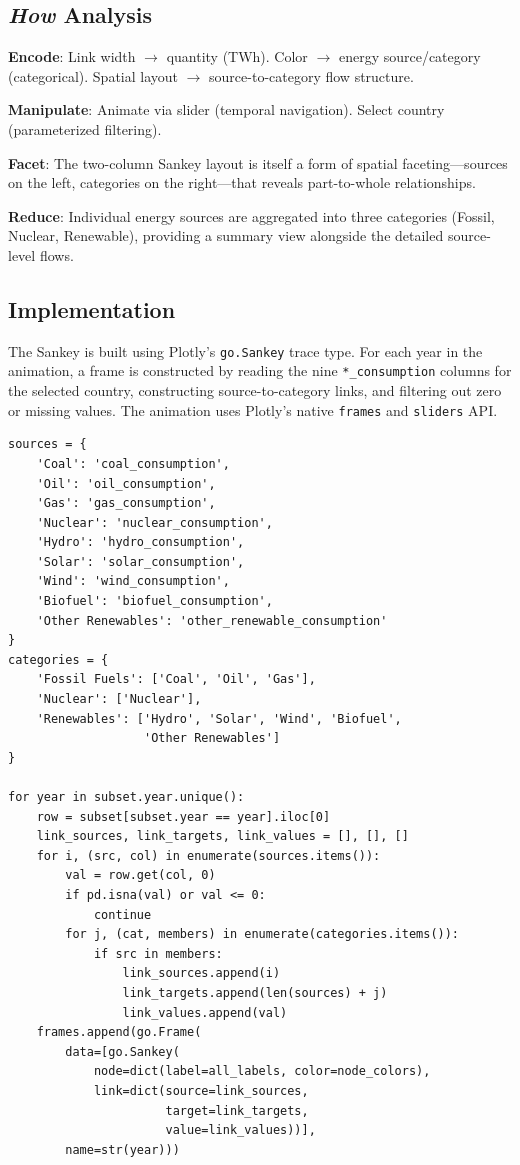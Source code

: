 \documentclass[10pt]{article}
\begin{document}
\subsection{\emph{How} Analysis}

\textbf{Encode}: Link width $\rightarrow$ quantity (TWh). Color $\rightarrow$ energy source/category (categorical). Spatial layout $\rightarrow$ source-to-category flow structure.

\textbf{Manipulate}: Animate via slider (temporal navigation). Select country (parameterized filtering).

\textbf{Facet}: The two-column Sankey layout is itself a form of spatial faceting---sources on the left, categories on the right---that reveals part-to-whole relationships.

\textbf{Reduce}: Individual energy sources are aggregated into three categories (Fossil, Nuclear, Renewable), providing a summary view alongside the detailed source-level flows.

\subsection{Implementation}

The Sankey is built using Plotly's \texttt{go.Sankey} trace type. For each year in the animation, a frame is constructed by reading the nine \texttt{*\_consumption} columns for the selected country, constructing source-to-category links, and filtering out zero or missing values. The animation uses Plotly's native \texttt{frames} and \texttt{sliders} API.

\begin{lstlisting}[caption={Core Sankey frame construction (simplified)},label=lst:sankey]
sources = {
    'Coal': 'coal_consumption',
    'Oil': 'oil_consumption',
    'Gas': 'gas_consumption',
    'Nuclear': 'nuclear_consumption',
    'Hydro': 'hydro_consumption',
    'Solar': 'solar_consumption',
    'Wind': 'wind_consumption',
    'Biofuel': 'biofuel_consumption',
    'Other Renewables': 'other_renewable_consumption'
}
categories = {
    'Fossil Fuels': ['Coal', 'Oil', 'Gas'],
    'Nuclear': ['Nuclear'],
    'Renewables': ['Hydro', 'Solar', 'Wind', 'Biofuel',
                   'Other Renewables']
}

for year in subset.year.unique():
    row = subset[subset.year == year].iloc[0]
    link_sources, link_targets, link_values = [], [], []
    for i, (src, col) in enumerate(sources.items()):
        val = row.get(col, 0)
        if pd.isna(val) or val <= 0:
            continue
        for j, (cat, members) in enumerate(categories.items()):
            if src in members:
                link_sources.append(i)
                link_targets.append(len(sources) + j)
                link_values.append(val)
    frames.append(go.Frame(
        data=[go.Sankey(
            node=dict(label=all_labels, color=node_colors),
            link=dict(source=link_sources,
                      target=link_targets,
                      value=link_values))],
        name=str(year)))
\end{lstlisting}
\end{document}
